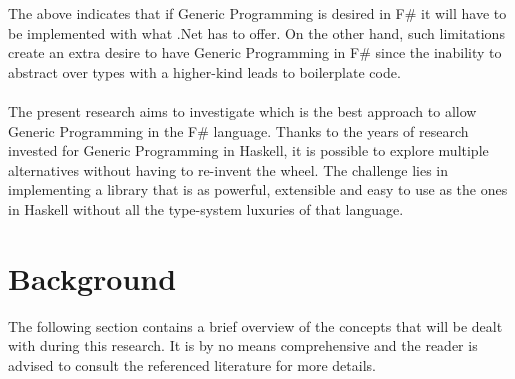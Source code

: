 \documentclass[8pt]{extarticle}
\begin{document}
The above indicates that if Generic Programming is desired in F\# it will have to be implemented with what .Net has to offer. On the other hand, such limitations create an extra desire to have Generic Programming in F\# since the inability to abstract over types with a higher-kind leads to boilerplate code.
\\\\
The present research aims to investigate which is the best approach to allow Generic Programming in the F\# language. Thanks to the years of research invested for Generic Programming in Haskell, it is possible to explore multiple alternatives without having to re-invent the wheel. The challenge lies in implementing a library that is as powerful, extensible and easy to use as the ones in Haskell without all the type-system luxuries of that language.
\section{Background}
The following section contains a brief overview of the concepts that will be dealt with during this research. It is by no means comprehensive and the reader is advised to consult the referenced literature for more details.
\end{document}
